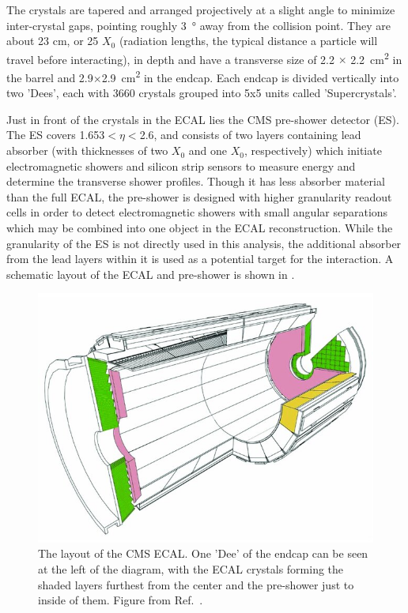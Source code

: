 The crystals are tapered and arranged projectively at a slight angle to minimize inter-crystal gaps, pointing roughly \SI{3}{\degree} away from the collision point. 
They are about 23 cm, or 25 $X_0$ (radiation lengths, the typical distance a particle will travel before interacting), in depth and have a transverse size of 2.2 $\times$ \SI{2.2}{\centi\meter^2} in the barrel and 2.9$\times$\SI{2.9}{\centi\meter^2} in the endcap. 
Each endcap is divided vertically into two 'Dees', each with 3660 crystals grouped into 5x5 units called 'Supercrystals'.

Just in front of the crystals in the ECAL lies the CMS pre-shower detector (ES). 
The ES covers 1.653$<\eta<$2.6, and consists of two layers containing lead absorber (with thicknesses of two $X_0$ and one $X_0$, respectively) which initiate electromagnetic showers and silicon strip sensors to measure energy and determine the transverse shower profiles. 
Though it has less absorber material than the full ECAL, the pre-shower is designed with higher granularity readout cells in order to detect electromagnetic showers with small angular separations which may be combined into one object in the ECAL reconstruction.
While the granularity of the ES is not directly used in this analysis, the additional absorber from the lead layers within it is used as a potential target for the \dbrem interaction.
A schematic layout of the ECAL and pre-shower is shown in .

\begin{figure}[htbp]
    \includegraphics[width=\textwidth]{figures/ecal_layout.jpg}
    \centering
	\caption[The CMS Electromagnetic Calorimeter]{The layout of the CMS ECAL. One 'Dee' of the endcap can be seen at the left of the diagram, with the ECAL crystals forming the shaded layers furthest from the center and the pre-shower just to inside of them. Figure from Ref.~\cite{cooke2022}.}
    \label{fig:ecalLayout}
\end{figure}

